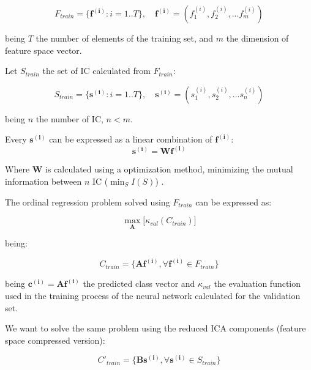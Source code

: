 \documentclass[review]{elsarticle}
\theoremstyle{definition} %
\theoremstyle{remark}
\begin{document}
\begin{equation}
	F_{train} = \{\boldsymbol{f^{(i)}} : i = 1 .. T\}, \quad \boldsymbol{f^{(i)}} = (f^{(i)}_1, f^{(i)}_2, ... f^{(i)}_m)
\end{equation}

being $T$ the number of elements of the training set, and $m$ the dimension of feature space vector.

Let $S_{train}$ the set of IC calculated from $F_{train}$:

\begin{equation}
	S_{train} = \{\boldsymbol{s^{(i)}} : i = 1 .. T\}, \quad \boldsymbol{s^{(i)}} = (s^{(i)}_1, s^{(i)}_2, ... s^{(i)}_n)
\end{equation}

being $n$ the number of IC, $n < m$.

Every $\boldsymbol{s^{(i)}}$ can be expressed as a linear combination of $\boldsymbol{f^{(i)}}$:
\begin{equation}
\boldsymbol{s^{(i)}} = \boldsymbol{W} \boldsymbol{f^{(i)}}
\end{equation}

Where $\boldsymbol{W}$ is calculated using a optimization method, minimizing the mutual information between $n$ IC ($\min_{S} I(S)$) \cite{hyvarinen1999fast}.

The ordinal regression problem solved using $F_{train}$ can be expressed as:

\begin{equation}
\max_{\boldsymbol{A}} \big[ \kappa_{val} (C_{train}) \big]
\end{equation}

being:

\begin{equation}
C_{train} = \{ \boldsymbol{A} \boldsymbol{f^{(i)}}, \forall \boldsymbol{f^{(i)}} \in F_{train} \} 
\end{equation}


being $\boldsymbol{c^{(i)}} = \boldsymbol{A} \boldsymbol{f^{(i)}}$ the predicted class vector and $\kappa_{val}$ the evaluation function used in the training process of the neural network calculated for the validation set.

We want to solve the same problem using the reduced ICA components (feature space compressed version):

\begin{equation}
C'_{train} = \{ \boldsymbol{B} \boldsymbol{s^{(i)}}, \forall \boldsymbol{s^{(i)}} \in S_{train} \} 
\end{equation}
\end{document}
